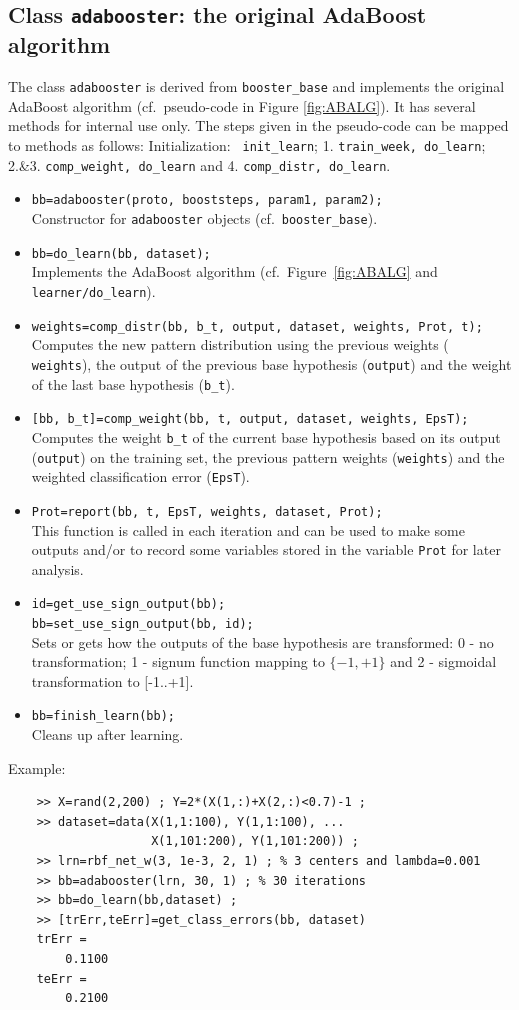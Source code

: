 \documentclass{article}
\begin{document}
\subsection{Class {\tt adabooster}: the original AdaBoost algorithm}
The class {\tt adabooster} is derived from {\tt booster\_base} and implements
the original AdaBoost algorithm \cite{FreSch94} (cf.~pseudo-code in Figure
\ref{fig:ABALG}). It has several methods for internal use only. The steps given
in the pseudo-code can be mapped to methods as follows: Initialization: {\tt
  init\_learn}; 1. {\tt train\_week, do\_learn}; 2.\&3. {\tt comp\_weight,
  do\_learn} and 4. {\tt comp\_distr, do\_learn}. 
\begin{itemize}
\item {\tt bb=adabooster(proto, booststeps, param1, param2);}\\
  Constructor for {\tt adabooster} objects (cf.~{\tt booster\_base}).
\item {\tt bb=do\_learn(bb, dataset);}\\
  Implements the AdaBoost algorithm (cf.~Figure~\ref{fig:ABALG} and {\tt
    learner/do\_learn}).
\item {\tt weights=comp\_distr(bb, b\_t, output, dataset, weights, Prot,
    t);}\\
  Computes the new pattern distribution using the previous weights ({\tt
    weights}), the output of the previous base hypothesis ({\tt output}) and
  the weight of the last base hypothesis ({\tt b\_t}).
\item {\tt [bb, b\_t]=comp\_weight(bb, t, output, dataset, weights,
    EpsT);}\\
  Computes the weight {\tt b\_t} of the current base hypothesis based on its
  output ({\tt output}) on the training set, the previous pattern weights
  ({\tt weights}) and the weighted classification error ({\tt EpsT}).
\item {\tt Prot=report(bb, t, EpsT, weights, dataset, Prot);}\\
  This function is called in each iteration and can be used to make some
  outputs and/or to record some variables stored in the variable {\tt Prot}
  for later analysis.
\item  {\tt id=get\_use\_sign\_output(bb);\\
    bb=set\_use\_sign\_output(bb, id);}\\
  Sets or gets how the outputs of the base hypothesis are transformed: 0 - no
  transformation; 1 - signum function mapping to $\{-1,+1\}$ and 2 - sigmoidal
  transformation to [-1..+1].
\item {\tt bb=finish\_learn(bb);} \\
  Cleans up after learning.
\end{itemize}
Example:
\begin{verbatim}
    >> X=rand(2,200) ; Y=2*(X(1,:)+X(2,:)<0.7)-1 ;
    >> dataset=data(X(1,1:100), Y(1,1:100), ...
                    X(1,101:200), Y(1,101:200)) ;
    >> lrn=rbf_net_w(3, 1e-3, 2, 1) ; % 3 centers and lambda=0.001
    >> bb=adabooster(lrn, 30, 1) ; % 30 iterations
    >> bb=do_learn(bb,dataset) ;
    >> [trErr,teErr]=get_class_errors(bb, dataset) 
    trErr =
        0.1100
    teErr =
        0.2100
\end{verbatim}
\end{document}

